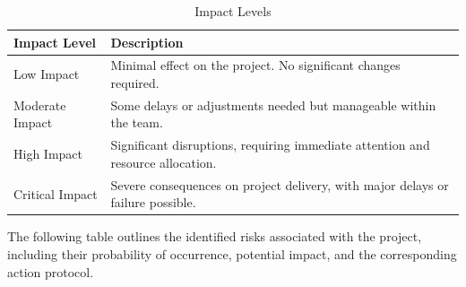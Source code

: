 \documentclass{scrreprt}
\begin{document}
\begin{table}[h!]
	\centering \small
	\renewcommand{\arraystretch}{1.5} 
	\begin{tabular}{|p{5cm}|p{10cm}|} 
		\hline
		\textbf{Impact Level} & \textbf{Description} \\ \hline
		Low Impact & Minimal effect on the project. No significant changes required. \\ \hline
		Moderate Impact & Some delays or adjustments needed but manageable within the team. \\ \hline
		High Impact & Significant disruptions, requiring immediate attention and resource allocation. \\ \hline
		Critical Impact & Severe consequences on project delivery, with major delays or failure possible. \\ \hline
	\end{tabular}
	\caption{Impact Levels}
\end{table} \FloatBarrier
The following table outlines the identified risks associated with the project, including their probability of occurrence, potential impact, and the corresponding action protocol.
\end{document}
